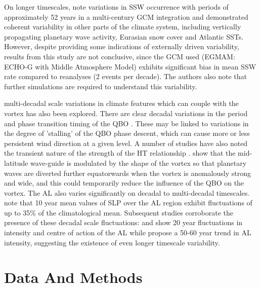 On longer timescales, \cite{Schimanke2011} note variations in SSW occurrence with periods of approximately 52 years in a multi-century GCM integration and demonstrated coherent variability in other parts of the climate system, including vertically propagating planetary wave activity, Eurasian snow cover and Atlantic SSTs. However, despite providing some indications of externally driven variability, results from this study are not conclusive, since the GCM used (EGMAM: ECHO‐G with Middle Atmosphere Model) exhibits significant bias in mean SSW rate compared to reanalyses (2 events per decade). The authors also note that further simulations are required to understand this variability. 

multi-decadal scale variations in climate features which can couple with the vortex has also been explored. There are clear decadal variations in the period and phase transition timing of the QBO \citep{Pascoe2005,Anstey2008,Yang2016}. These may be linked to variations in the degree of 'stalling' of the QBO phase descent, which can cause more or less persistent wind direction at a given level.  A number of studies have also noted the transient nature of the strength of the HT relationship \citep{Lu2008,Lu14,Anstey2008,OspEA10}. \cite{Lu2008,Lu14} show that the mid-latitude wave-guide is modulated by the shape of the vortex so that planetary waves are diverted further equatorwards when the vortex is anomalously strong and wide, and this could temporarily reduce the influence of the QBO on the vortex. The AL also varies significantly on decadal to multi-decadal timescales. \cite{Overland1999} note that 10 year mean values of SLP over the AL region exhibit fluctuations of up to 35\% of the climatological mean. Subsequent studies corroborate the presence of these decadal scale fluctuations: \cite{SUGIMOTO2009} and \cite{Minobe} show 20 year fluctuations in intensity and centre of action of the AL while \cite{Raible2005} propose a 50-60 year trend in AL intensity, suggesting the existence of even longer timescale variability. 

\section{Data And Methods}
